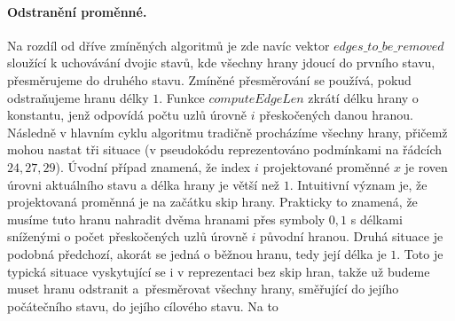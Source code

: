 \paragraph{Odstranění proměnné.} Na rozdíl od dříve zmíněných algoritmů je zde navíc vektor $edges\_to\_be\_removed$ sloužící k uchovávání dvojic stavů, kde všechny hrany jdoucí do prvního stavu, přesměrujeme do druhého stavu. Zmíněné přesměrování se používá, pokud odstraňujeme hranu délky $1$. Funkce $computeEdgeLen$ zkrátí délku hrany o konstantu, jenž odpovídá počtu uzlů úrovně $i$ přeskočených danou hranou. Následně v hlavním cyklu algoritmu tradičně procházíme všechny hrany, přičemž mohou nastat tři situace (v pseudokódu reprezentováno podmínkami na řádcích $24,27,29$). Úvodní případ znamená, že index $i$ projektované proměnné $x$ je roven úrovni aktuálního stavu a délka hrany je větší než $1$. Intuitivní význam je, že projektovaná proměnná je na začátku skip hrany. Prakticky to znamená, že musíme tuto hranu nahradit dvěma hranami přes symboly $0,1$ s délkami sníženými o počet přeskočených uzlů úrovně $i$ původní hranou. Druhá situace je podobná předchozí, akorát se jedná o běžnou hranu, tedy její délka je $1$. Toto je typická situace vyskytující se i v reprezentaci bez skip hran, takže už budeme muset hranu odstranit a~přesměrovat všechny hrany, směřující do jejího počátečního stavu, do jejího cílového stavu. Na to 

